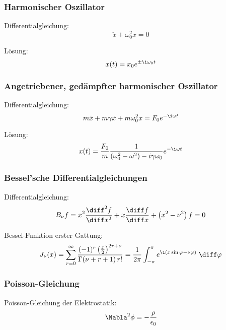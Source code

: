 \documentclass[11pt]{article}
\numberwithin{equation}{section}
\begin{document}
			\subsubsection{Harmonischer Oszillator}
				\noindent
				Differentialgleichung:
				\begin{equation}
					\ddot{x}+\omega_0^2 x = 0
				\end{equation}

				\noindent
				Lösung:
				\begin{equation}
					x(t)=x_0 e^{\pm \i\omega_0 t}
				\end{equation}

			\subsubsection{Angetriebener, gedämpfter harmonischer Oszillator}
				\noindent
				Differentialgleichung:
				\begin{equation}
					m\ddot{x}+m\gamma\dot{x}+m\omega_0^2 x = F_0 e^{-\i\omega t}
				\end{equation}

				\noindent
				Lösung:
				\begin{equation}
					x(t) = \frac{F_0}{m} \frac{1}{\left(\omega_0^2-\omega^2\right)-i\gamma\omega_0} e^{-\i\omega t}
				\end{equation}

			\subsubsection{Bessel'sche Differentialgleichungen}
				\noindent
				Differentialgleichung:
				\begin{equation}
					B_\nu f = x^2\frac{\diff^2 f}{\diff x^2} + x\tder{f}{x}+\left(x^2-\nu^2\right)f = 0
				\end{equation}

				\noindent
				Bessel-Funktion erster Gattung:
				\begin{equation}
					J_\nu(x) = \sum_{r=0}^\infty \frac{(-1)^r\left(\frac{x}{2}\right)^{2r+\nu}}{\Gamma(\nu+r+1)\,r!} = \frac{1}{2\pi}\int_{-\pi}^{\pi} 	e^{\i(x\sin\varphi-\nu\varphi)}\;\diff\varphi
				\end{equation}

			\subsubsection{Poisson-Gleichung}
				\noindent
				Poisson-Gleichung der Elektrostatik:
				\begin{equation}
					\Nabla^2\phi = -\frac{\rho}{\epsilon_0}
				\end{equation}
\end{document}
